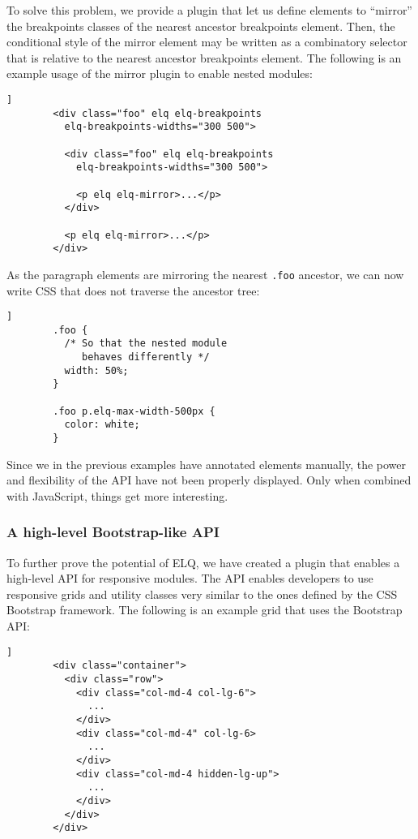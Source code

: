 \documentclass{acm_proc_article-sp}
\newcommand{\code}[1]{\texttt{#1}}
\newcommand{\elq}{ELQ}
\begin{document}
      To solve this problem, we provide a plugin that let us define elements to ``mirror'' the breakpoints classes of the nearest ancestor breakpoints element.
      Then, the conditional style of the mirror element may be written as a combinatory selector that is relative to the nearest ancestor breakpoints element.
      The following is an example usage of the mirror plugin to enable nested modules:

      \begin{lstlisting}[gobble=8,caption={},captionpos=b,label={}]]
        <div class="foo" elq elq-breakpoints
          elq-breakpoints-widths="300 500">
          
          <div class="foo" elq elq-breakpoints
            elq-breakpoints-widths="300 500">

            <p elq elq-mirror>...</p>
          </div>

          <p elq elq-mirror>...</p>
        </div>
      \end{lstlisting}

      As the paragraph elements are mirroring the nearest \code{.foo} ancestor, we can now write CSS that does not traverse the ancestor tree:

      \begin{lstlisting}[gobble=8,caption={},captionpos=b,label={code:elq-mirror-example-css}]]
        .foo {
          /* So that the nested module 
             behaves differently */
          width: 50%;
        }

        .foo p.elq-max-width-500px {
          color: white;
        }
      \end{lstlisting}

      Since we in the previous examples have annotated elements manually, the power and flexibility of the API have not been properly displayed.
      Only when combined with JavaScript, things get more interesting.

    \subsubsection{A high-level Bootstrap-like API}
      To further prove the potential of \elq{}, we have created a plugin that enables a high-level API for responsive modules.
      The API enables developers to use responsive grids and utility classes very similar to the ones defined by the CSS Bootstrap framework.
      The following is an example grid that uses the Bootstrap API:

      \begin{lstlisting}[gobble=8,caption={},captionpos=b,label={code:bootstrap-grid-example}]]
        <div class="container">
          <div class="row">
            <div class="col-md-4 col-lg-6">
              ...
            </div>
            <div class="col-md-4" col-lg-6>
              ...
            </div>
            <div class="col-md-4 hidden-lg-up">
              ...
            </div>
          </div>
        </div>
      \end{lstlisting}
\end{document}
